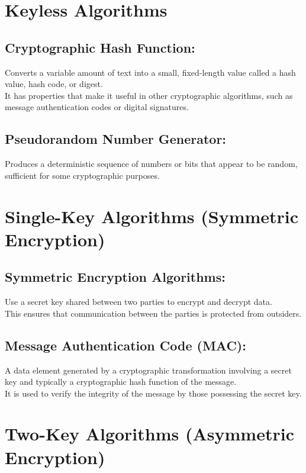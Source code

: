 \section{Keyless Algorithms}

\subsection{Cryptographic Hash Function:} 
Converts a variable amount of text into a small, fixed-length value called a hash value, hash code, or digest. 
\\
It has properties that make it useful in other cryptographic algorithms, such as message authentication codes or digital signatures.

\subsection{Pseudorandom Number Generator:} 
Produces a deterministic sequence of numbers or bits that appear to be random, sufficient for some cryptographic purposes.

\section{Single-Key Algorithms (Symmetric Encryption)}

\subsection{Symmetric Encryption Algorithms:} 
Use a secret key shared between two parties to encrypt and decrypt data. \\This ensures that communication between the parties is protected from outsiders.

\subsection{Message Authentication Code (MAC):} 
A data element generated by a cryptographic transformation involving a secret key and typically a cryptographic hash function of the message. \\It is used to verify the integrity of the message by those possessing the secret key.

\section{Two-Key Algorithms (Asymmetric Encryption)}

